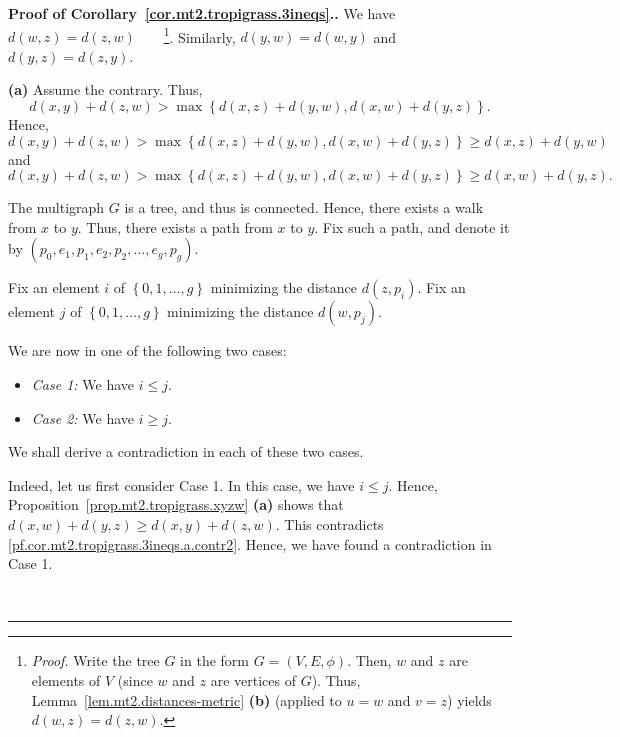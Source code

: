 \documentclass[numbers=enddot,12pt,final,onecolumn,notitlepage]{scrartcl}%
\theoremstyle{definition}
\newenvironment{proof}[1][Proof]{\noindent\textbf{#1.} }{\ \rule{0.5em}{0.5em}}
\newcommand{\set}[1]{\left\{ #1 \right\}}
\newcommand{\tup}[1]{\left( #1 \right)}
\begin{document}
\begin{proof}[Proof of Corollary~\ref{cor.mt2.tropigrass.3ineqs}.]
We have
$d \tup{w, z} = d \tup{z, w}$\ \ \ \ \footnote{\textit{Proof.}
  Write the tree $G$ in the form $G = \tup{V, E, \phi}$.
  Then, $w$ and $z$ are elements of $V$ (since
  $w$ and $z$ are vertices of $G$).
  Thus, Lemma~\ref{lem.mt2.distances-metric} \textbf{(b)}
  (applied to $u = w$ and $v = z$) yields
  $d \tup{w, z} = d \tup{z, w}$.
  }.
Similarly, $d \tup{y, w} = d \tup{w, y}$ and
$d \tup{y, z} = d \tup{z, y}$.

\textbf{(a)} Assume the contrary.
Thus,
\[
d \tup{x, y} + d \tup{z, w}
> \max
  \set{ d \tup{x, z} + d \tup{y, w}, d \tup{x, w} + d \tup{y, z} } .
\]
Hence,
\begin{equation}
d \tup{x, y} + d \tup{z, w}
> \max
  \set{ d \tup{x, z} + d \tup{y, w}, d \tup{x, w} + d \tup{y, z} }
\geq d \tup{x, z} + d \tup{y, w}
\label{pf.cor.mt2.tropigrass.3ineqs.a.contr1}
\end{equation}
and
\begin{equation}
d \tup{x, y} + d \tup{z, w}
> \max
  \set{ d \tup{x, z} + d \tup{y, w}, d \tup{x, w} + d \tup{y, z} }
\geq d \tup{x, w} + d \tup{y, z} .
\label{pf.cor.mt2.tropigrass.3ineqs.a.contr2}
\end{equation}

The multigraph $G$ is a tree, and thus is
connected.
Hence, there exists a walk from $x$ to $y$.
Thus, there exists a path from $x$ to $y$.
Fix such a path, and denote it by
$\tup{p_0, e_1, p_1, e_2, p_2, \ldots, e_g, p_g}$.

Fix an element $i$ of $\set{0, 1, \ldots, g}$ minimizing the
distance $d \tup{z, p_i}$.
Fix an element $j$ of $\set{0, 1, \ldots, g}$ minimizing the
distance $d \tup{w, p_j}$.

We are now in one of the following two cases:

\begin{itemize}
\item \textit{Case 1:} We have $i \leq j$.

\item \textit{Case 2:} We have $i \geq j$.
\end{itemize}

We shall derive a contradiction in each of these two cases.

Indeed, let us first consider Case 1.
In this case, we have $i \leq j$.
Hence, Proposition~\ref{prop.mt2.tropigrass.xyzw} \textbf{(a)}
shows that
$d \tup{x, w} + d \tup{y, z} \geq d \tup{x, y} + d \tup{z, w}$.
This contradicts \eqref{pf.cor.mt2.tropigrass.3ineqs.a.contr2}.
Hence, we have found a contradiction in Case 1.


\end{proof}
\end{document}
